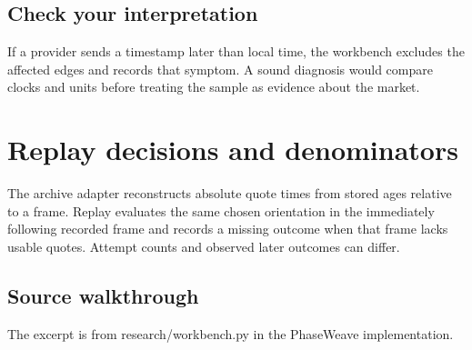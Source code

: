 \documentclass[11pt,oneside,openany]{book}
\begin{document}
\section*{Check your interpretation}
If a provider sends a timestamp later than local time, the workbench excludes the affected edges and records that symptom. A sound diagnosis would compare clocks and units before treating the sample as evidence about the market.

\chapter{Replay decisions and denominators}
The archive adapter reconstructs absolute quote times from stored ages relative to a frame. Replay evaluates the same chosen orientation in the immediately following recorded frame and records a missing outcome when that frame lacks usable quotes. Attempt counts and observed later outcomes can differ.

\section*{Source walkthrough}
The excerpt is from research/workbench.py in the PhaseWeave implementation.
\end{document}
